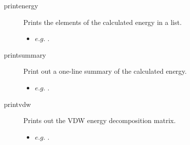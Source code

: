 \begin{description}
	\item[printenergy\its] Prints the elements of the calculated energy in a list.
	\begin{itemize}
		\item $e.g.$ .
	\end{itemize}

	\item[printsummary\its] Print out a one-line summary of the calculated energy.
	\begin{itemize}
		\item $e.g.$ .
	\end{itemize}

	\item[printvdw\its] Prints out the VDW energy decomposition matrix.
	\begin{itemize}
		\item $e.g.$ .
	\end{itemize}

\end{description}

